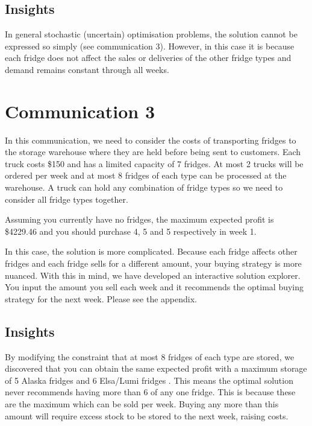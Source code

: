 \documentclass[11pt,a4paper]{article}
\begin{document}
\subsection{Insights}
In general stochastic (uncertain)
optimisation problems, the solution cannot be expressed so simply (see communication 3).
However, in this case it is because
each fridge does not affect the sales or deliveries of the other fridge types
and demand remains constant through all weeks.

\section{Communication 3}
In this communication, we need to consider the costs of transporting fridges to 
the storage warehouse where they are held before being sent to customers. 
Each truck costs \$150 and has a  limited capacity of 7 fridges. At most 2 trucks 
will be ordered per week and at most 8 fridges of each type can be processed 
at the warehouse. A truck can hold any combination of fridge types so we need 
to consider all fridge types together.

Assuming you currently have no fridges, the maximum expected profit is 
\$4229.46 and you should purchase 4, 5 and 5 respectively in week 1. 

In this case, the solution is more complicated. Because each fridge affects 
other fridges and each fridge sells for a different amount, your buying strategy 
is more nuanced. With this in mind, we have developed an interactive 
solution explorer. You input the amount you sell each week and it recommends 
the optimal buying strategy for the next week. Please see the appendix.

\subsection{Insights}
By modifying the constraint that at most 8 fridges of each type are stored, 
we discovered that you can obtain the same expected profit with a
maximum storage of 5 Alaska fridges and 6 Elsa/Lumi fridges . This means the optimal solution 
never recommends having more than 6 of any one fridge.
This is because these are the maximum which can be sold per week. Buying any more than this amount 
will require excess stock to be stored to the next week, raising costs. 
\end{document}
